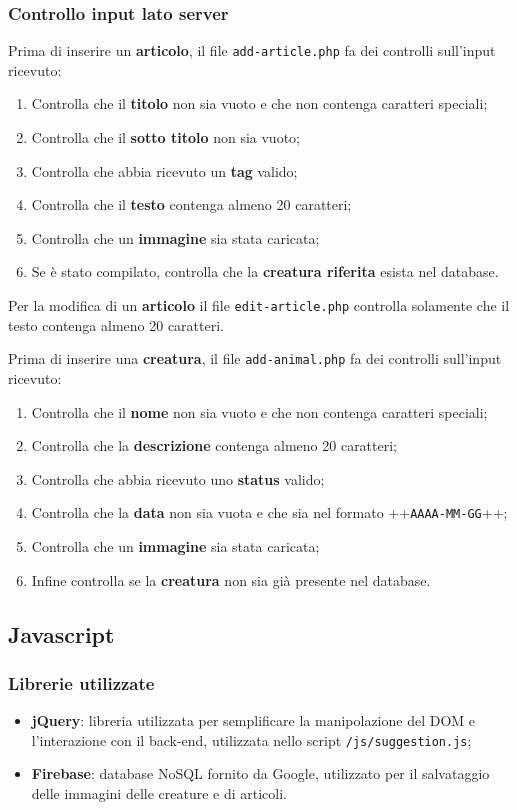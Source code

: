 \subsubsection{Controllo input lato server}
Prima di inserire un \textbf{articolo}, il file \texttt{add-article.php} fa dei controlli sull'input ricevuto:
\begin{enumerate}
    \item Controlla che il \textbf{titolo} non sia vuoto e che non contenga caratteri speciali;
    \item Controlla che il \textbf{sotto titolo} non sia vuoto;
    \item Controlla che abbia ricevuto un \textbf{tag} valido;
    \item Controlla che il \textbf{testo} contenga almeno 20 caratteri;
    \item Controlla che un \textbf{immagine} sia stata caricata;
    \item Se è stato compilato, controlla che la \textbf{creatura riferita} esista nel database.
\end{enumerate}

Per la modifica di un \textbf{articolo} il file \texttt{edit-article.php}  controlla solamente che il testo contenga almeno 20 caratteri.

Prima di inserire una \textbf{creatura}, il file \texttt{add-animal.php} fa dei controlli sull'input ricevuto:
\begin{enumerate}
    \item Controlla che il \textbf{nome} non sia vuoto e che non contenga caratteri speciali;
    \item Controlla che la \textbf{descrizione} contenga almeno 20 caratteri;
    \item Controlla che abbia ricevuto uno \textbf{status} valido;
    \item Controlla che la \textbf{data} non sia vuota e che sia nel formato ++\texttt{AAAA-MM-GG}++;
    \item Controlla che un \textbf{immagine} sia stata caricata;
    \item Infine controlla se la \textbf{creatura} non sia già presente nel database.
\end{enumerate}

\subsection{Javascript}
\label{subsec:javascript-back-end}
\subsubsection{Librerie utilizzate}
\begin{itemize}
    \item \textbf{jQuery}: libreria utilizzata per semplificare la manipolazione del DOM e l'interazione con il back-end, utilizzata nello script \texttt{/js/suggestion.js};
    \item \textbf{Firebase}: database NoSQL fornito da Google, utilizzato per il salvataggio delle immagini delle creature e di articoli.
\end{itemize}

